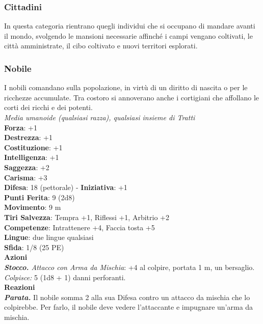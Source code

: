 \begin{multicols}{2}
\subsubsection{Cittadini}

In questa categoria rientrano quegli individui che si occupano di mandare avanti il mondo, svolgendo le mansioni necessarie affinché i campi vengano coltivati, le città amministrate, il cibo coltivato e nuovi territori esplorati.

\subsubsection{Nobile}

I nobili comandano sulla popolazione, in virtù di un diritto di nascita o per le ricchezze accumulate. Tra costoro si annoverano anche i cortigiani che affollano le corti dei ricchi e dei potenti.\\
\emph{Media umanoide (qualsiasi razza), qualsiasi insieme di Tratti}\\
\textbf{Forza}: +1\\
\textbf{Destrezza}: +1\\
\textbf{Costituzione}: +1\\
\textbf{Intelligenza}: +1\\
\textbf{Saggezza}: +2\\
\textbf{Carisma}: +3\\
\textbf{Difesa}: 18 (pettorale) - \textbf{Iniziativa}: +1\\
\textbf{Punti Ferita}: 9 (2d8)\\
\textbf{Movimento}: 9 m\\
\textbf{Tiri Salvezza}: Tempra +1, Riflessi +1, Arbitrio +2 \\
\textbf{Competenze}: Intrattenere +4, Faccia tosta +5\\
\textbf{Lingue}: due lingue qualsiasi\\
\textbf{Sfida}: 1/8 (25 PE)\smallskip\\
\smallskip\textbf{Azioni}\\
\emph{\textbf{Stocco.} Attacco con Arma da Mischia}: +4 al colpire, portata 1 m, un bersaglio.\\
\emph{Colpisce:} 5 (1d8 + 1) danni perforanti.\\
\textbf{Reazioni}\\
\emph{\textbf{Parata.}} Il nobile somma 2 alla sua Difesa contro un attacco da mischia che lo colpirebbe. Per farlo, il nobile deve vedere l'attaccante e impugnare un'arma da mischia.\\


\end{multicols}
